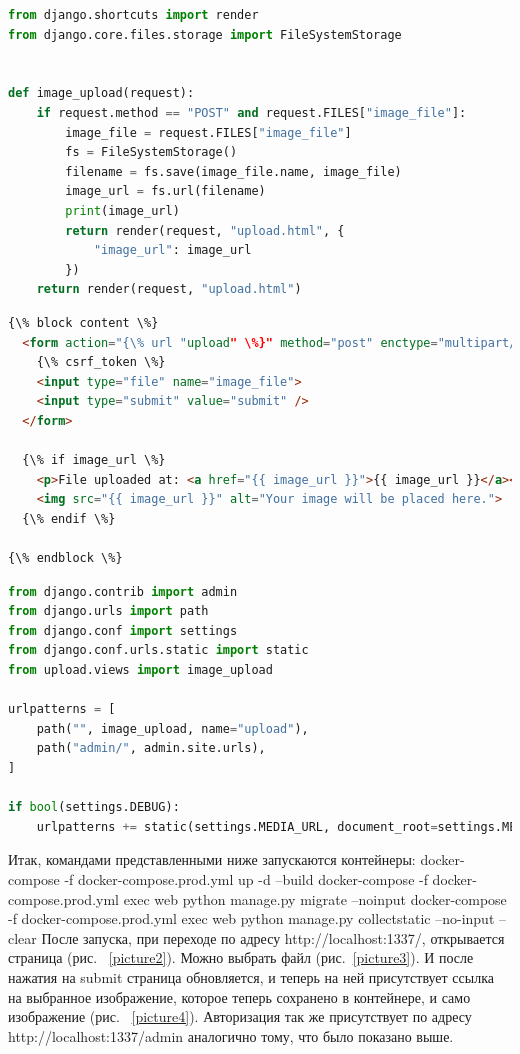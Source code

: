 \begin{lstlisting}[frame=single, label={views}, caption={views.py}, language=Python] 
from django.shortcuts import render
from django.core.files.storage import FileSystemStorage


def image_upload(request):
    if request.method == "POST" and request.FILES["image_file"]:
        image_file = request.FILES["image_file"]
        fs = FileSystemStorage()
        filename = fs.save(image_file.name, image_file)
        image_url = fs.url(filename)
        print(image_url)
        return render(request, "upload.html", {
            "image_url": image_url
        })
    return render(request, "upload.html")
\end{lstlisting}

\begin{lstlisting}[frame=single, label={upload}, caption={\textsf{upload.html}}, language=HTML] 
{\% block content \%}
  <form action="{\% url "upload" \%}" method="post" enctype="multipart/form-data">
    {\% csrf_token \%}
    <input type="file" name="image_file">
    <input type="submit" value="submit" />
  </form>

  {\% if image_url \%}
    <p>File uploaded at: <a href="{{ image_url }}">{{ image_url }}</a></p>
    <img src="{{ image_url }}" alt="Your image will be placed here.">
  {\% endif \%}

{\% endblock \%}
\end{lstlisting}

\begin{lstlisting}[frame=single, label={urls}, caption={\textsf{urls.py}}, language=Python] 
from django.contrib import admin
from django.urls import path
from django.conf import settings
from django.conf.urls.static import static
from upload.views import image_upload

urlpatterns = [
    path("", image_upload, name="upload"),
    path("admin/", admin.site.urls),
]

if bool(settings.DEBUG):
    urlpatterns += static(settings.MEDIA_URL, document_root=settings.MEDIA_ROOT)
\end{lstlisting}

	Итак, командами представленными ниже запускаются контейнеры:
\textsf{docker-compose -f docker-compose.prod.yml up -d --build}
\textsf{docker-compose -f docker-compose.prod.yml exec web python manage.py migrate --noinput}
\textsf{docker-compose -f docker-compose.prod.yml exec web python manage.py collectstatic --no-input –clear}
	После запуска, при переходе по адресу \textsf{http://localhost:1337/}, открывается страница (рис. ~\ref{picture2}). Можно выбрать файл (рис.~\ref{picture3}). И после нажатия на \textsf{submit} страница обновляется, и теперь на ней присутствует ссылка на выбранное изображение, которое теперь сохранено в контейнере, и само изображение (рис. ~\ref{picture4}). Авторизация так же присутствует по адресу \textsf{http://localhost:1337/admin} аналогично тому, что было показано выше.

